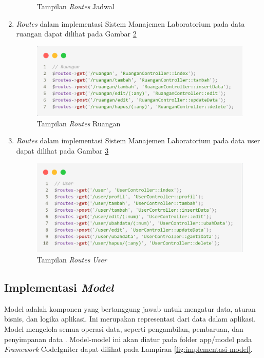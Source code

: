 \begin{enumerate}
\begin{figure}
		      \caption{Tampilan \textit{Routes} Jadwal}
		      \label{fig:routes-jadwal}
	      \end{figure}
	\item \textit{Routes} dalam implementasi Sistem Manajemen Laboratorium pada data ruangan dapat dilihat pada Gambar \ref{fig:routes-ruangan}
	      \begin{figure}
		      \centering
		      \includegraphics[width=0.82\linewidth]{konten//gambar/routes/ruangan.png}
		      \caption{Tampilan \textit{Routes} Ruangan}
		      \label{fig:routes-ruangan}
	      \end{figure}
	\item \textit{Routes} dalam implementasi Sistem Manajemen Laboratorium pada data user dapat dilihat pada Gambar \ref{fig:routes-user}
	      \begin{figure}
		      \centering
		      \includegraphics[width=0.82\linewidth]{konten//gambar/routes/user.png}
		      \caption{Tampilan \textit{Routes} \textit{User}}
		      \label{fig:routes-user}
	      \end{figure}
\end{enumerate}

\subsection{Implementasi \textit{Model}}
Model adalah komponen yang bertanggung jawab untuk mengatur data, aturan bisnis, dan logika aplikasi. Ini merupakan representasi dari data dalam aplikasi. Model mengelola semua operasi data, seperti pengambilan, pembaruan, dan penyimpanan data \cite{firdaus2020rancang}. Model-model ini akan diatur pada folder app/model pada \textit{Framework} CodeIgniter dapat dilihat pada Lampiran \ref{fig:implementasi-model}.



